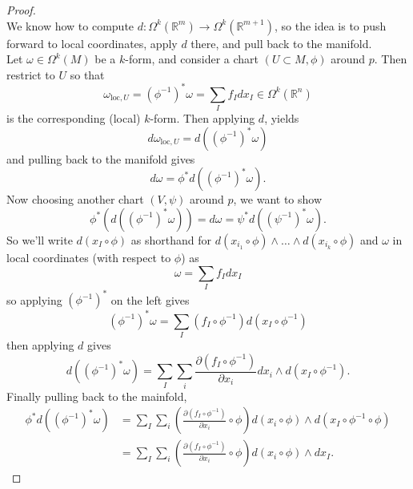 \documentclass{article}
\begin{document}
\begin{proof} \text{}\\
  We know how to compute
  $d\colon \Omega^k(\mathbb{R}^m) \rightarrow \Omega^k(\mathbb{R}^{m+1})$,
  so the idea is to push forward to local coordinates, apply $d$ there, and
  pull back to the manifold.
  \\
  Let $\omega \in \Omega^k(M)$ be a $k$-form, and consider a chart
  $(U \subset M, \phi)$ around $p$. Then restrict to $U$ so that \[
    \omega_{\text{loc}, U} = (\phi^{-1})^*\omega = \sum_I f_I dx_I \in \Omega^k(\mathbb{R}^n)
  \]
  is the corresponding (local) $k$-form. Then applying $d$, yields
  \[
    d\omega_{\text{loc}, U}
    = d((\phi^{-1})^*\omega)
  \]
  and pulling back to the manifold gives \[
    d\omega = \phi^*d((\phi^{-1})^*\omega).
  \]
  Now choosing another chart $(V, \psi)$ around $p$, we want to show \[
    \phi^*(d((\phi^{-1})^*\omega)) = d\omega = \psi^*d((\psi^{-1})^*\omega).
  \]
  So we'll write $d(x_I \circ \phi)$ as shorthand for
  $d(x_{i_1} \circ \phi) \wedge \hdots \wedge d(x_{i_k} \circ \phi)$
  and $\omega$ in local coordinates (with respect to $\phi$) as \[
    \omega = \sum_I f_I dx_I
  \] so applying $(\phi^{-1})^*$ on the left gives \[
    (\phi^{-1})^*\omega = \sum_I (f_I \circ \phi^{-1}) d(x_I \circ \phi^{-1})
  \] then applying $d$ gives \[
    d((\phi^{-1})^*\omega) = \sum_I\sum_i \frac{\partial(f_I \circ \phi^{-1})}{\partial x_i}dx_i \wedge d(x_I \circ \phi^{-1}).
  \] Finally pulling back to the mainfold, \begin{align*}
    \phi^*d((\phi^{-1})^*\omega)
    &= \sum_I\sum_i \left(
      \frac{\partial(f_I \circ \phi^{-1})}{\partial x_i} \circ \phi
    \right)d(x_i \circ \phi) \wedge d(x_I \circ \phi^{-1} \circ \phi)\\
    &= \sum_I\sum_i \left(
      \frac{\partial(f_I \circ \phi^{-1})}{\partial x_i} \circ \phi
    \right)d(x_i \circ \phi) \wedge dx_I.
  \end{align*}

\end{proof}
\end{document}

